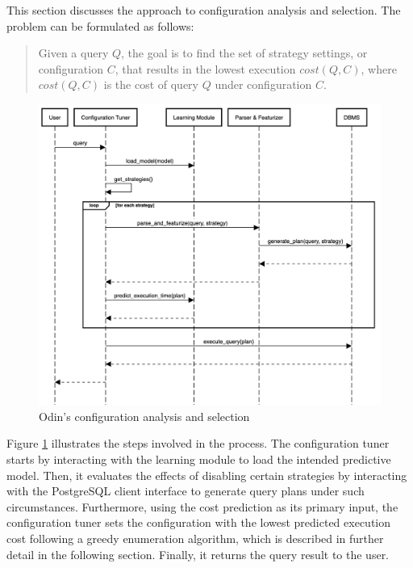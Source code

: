 This section discusses the approach to configuration analysis and selection. The problem can be formulated as follows:

\begin{quote}
Given a query $Q$, the goal is to find the set of strategy settings, or configuration $C$, that results in the lowest execution $cost(Q, C)$, where $cost(Q, C)$ is the cost of query $Q$ under configuration $C$.
\end{quote}

\begin{figure}[H]
\centering
\includegraphics[width=\textwidth]{img/solution/configuration_selection_sequence_diagram.png}
\caption{Odin's configuration analysis and selection}
\label{fig:configuration_analysis_and_selection}
\end{figure}

Figure \ref{fig:configuration_analysis_and_selection} illustrates the steps involved in the process. The configuration tuner starts by interacting with the learning module to load the intended predictive model. Then, it evaluates the effects of disabling certain strategies by interacting with the PostgreSQL client interface to generate query plans under such circumstances. Furthermore, using the cost prediction as its primary input, the configuration tuner sets the configuration with the lowest predicted execution cost following a greedy enumeration algorithm, which is described in further detail in the following section. Finally, it returns the query result to the user.

